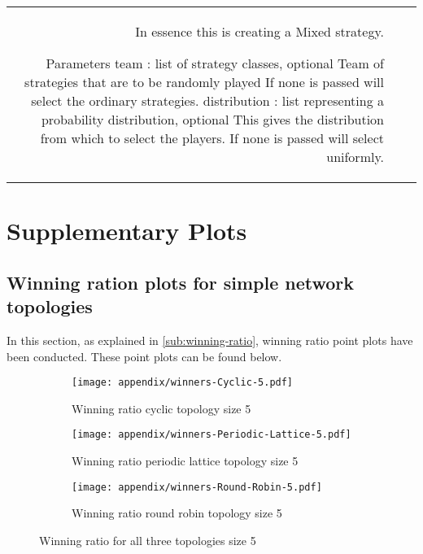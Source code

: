 \begin{tabular}{rll}
	In essence this is creating a Mixed strategy.

	Parameters
	team : list of strategy classes, optional
	Team of strategies that are to be randomly played
	If none is passed will select the ordinary strategies.
	distribution : list representing a probability distribution, optional
	This gives the distribution from which to select the players.
	If none is passed will select uniformly.                                                                                                                                                                                                                                                                                                                                                                                                                    \\
\end{tabular}


\section{Supplementary Plots}
\subsection{Winning ration plots for simple network topologies}
\label{append:wining-ratio-further-plot}
In this section, as explained in \autoref{sub:winning-ratio}, winning ratio point plots
have been conducted. These point plots can be found below.
\begin{figure}[H]
	\centering
	\begin{subfigure}[t]{0.75\textwidth}
		\centering
		\texttt{[image: appendix/winners-Cyclic-5.pdf]}
		\caption{Winning ratio cyclic topology size 5}
	\end{subfigure}
	\hfill
	\begin{subfigure}[t]{0.75\textwidth}\centering
		\centering
		\texttt{[image: appendix/winners-Periodic-Lattice-5.pdf]}
		\caption{Winning ratio periodic lattice topology size 5}
	\end{subfigure}
	\hfill
	\begin{subfigure}[t]{0.75\textwidth}\centering
		\centering
		\texttt{[image: appendix/winners-Round-Robin-5.pdf]}
		\caption{Winning ratio round robin topology size 5}
	\end{subfigure}
	\caption{Winning ratio for all three topologies size 5}
	\label{fig:winning-five}

\end{figure}

